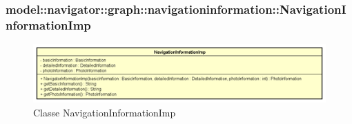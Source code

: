 \documentclass[../DefinizioneDiProdotto.tex]{subfiles}
\begin{document}
\subsubsection{model::navigator::graph::navigationinformation::NavigationInformationImp}

    \begin{figure}[H]
        \centering
        \includegraphics{img/NavigationInformationImp.png}
        \caption{Classe NavigationInformationImp}\label{fig:model::navigator::graph::navigationinformation::NavigationInformationImp} 
    \end{figure}
\end{document}
